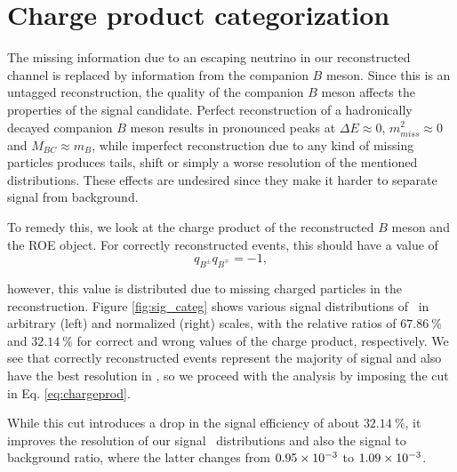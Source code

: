 \section{Charge product categorization}\label{sec:event-categorization}

The missing information due to an escaping neutrino in our reconstructed channel is replaced by information from the companion $B$ meson. Since this is an untagged reconstruction, the quality of the companion $B$ meson affects the properties of the signal candidate. Perfect reconstruction of a hadronically decayed companion $B$ meson results in pronounced peaks at $\Delta E \approx 0$, $m_{miss}^2 \approx 0$ and $M_{BC} \approx m_B$, while imperfect reconstruction due to any kind of missing particles produces tails, shift or simply a worse resolution of the mentioned distributions. These effects are undesired since they make it harder to separate signal from background.

To remedy this, we look at the charge product of the reconstructed $B$ meson and the ROE object. For correctly reconstructed events, this should have a value of 
\begin{equation}
\label{eq:chargeprod}
q_{B^\pm}q_{B^\mp} = -1,
\end{equation}

however, this value is distributed due to missing charged particles in the reconstruction. Figure \ref{fig:sig_categ} shows various signal distributions of \vars~in arbitrary (left) and normalized (right) scales, with the relative ratios of $67.86~\%$ and $32.14~\%$ for correct and wrong values of the charge product, respectively. We see that correctly reconstructed events represent the majority of signal and also have the best resolution in \vars, so we proceed with the analysis by imposing the cut in Eq. \ref{eq:chargeprod}.

While this cut introduces a drop in the signal efficiency of about $32.14~\%$, it improves the resolution of our signal \vars~distributions and also the signal to background ratio, where the latter changes from $0.95\times 10^{-3}$ to $1.09\times 10^{-3}$.

